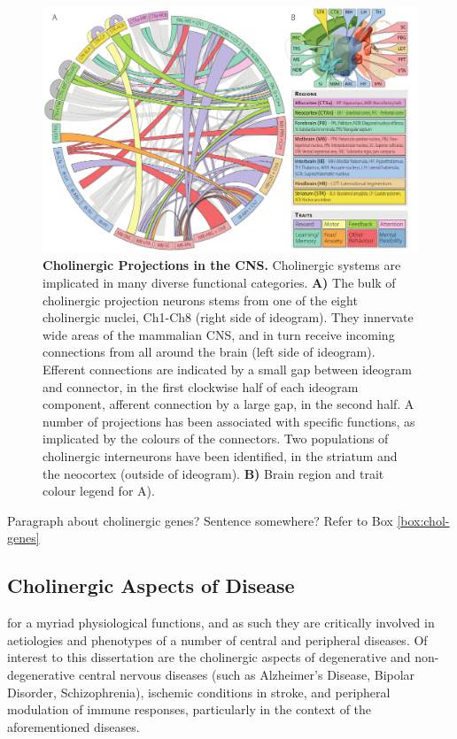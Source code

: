 \begin{figure}
\includegraphics[width=\textwidth]{figures/projections}
\caption[Cholinergic Projections.]{\textbf{Cholinergic Projections in the CNS.} Cholinergic systems are implicated in many diverse functional categories. \textbf{A)} The bulk of cholinergic projection neurons stems from one of the eight cholinergic nuclei, Ch1-Ch8 (right side of ideogram). They innervate wide areas of the mammalian CNS, and in turn receive incoming connections from all around the brain (left side of ideogram). Efferent connections are indicated by a small gap between ideogram and connector, in the first clockwise half of each ideogram component, afferent connection by a large gap, in the second half. A number of projections has been associated with specific functions, as implicated by the colours of the connectors. Two populations of cholinergic interneurons have been identified, in the striatum and the neocortex (outside of ideogram). \textbf{B)} Brain region and trait colour legend for A).
\label{fig:projections}}
\end{figure}

Paragraph about cholinergic genes? Sentence somewhere? Refer to Box \ref{box:chol-genes}

\subsection{Cholinergic Aspects of Disease} \label{sec:intro:diseases}
 for a myriad physiological functions, and as such they are critically involved in aetiologies and phenotypes of a number of central and peripheral diseases. Of interest to this dissertation are the cholinergic aspects of degenerative and non-degenerative central nervous diseases (such as Alzheimer's Disease, Bipolar Disorder, Schizophrenia), ischemic conditions in stroke, and peripheral modulation of immune responses, particularly in the context of the aforementioned diseases.

